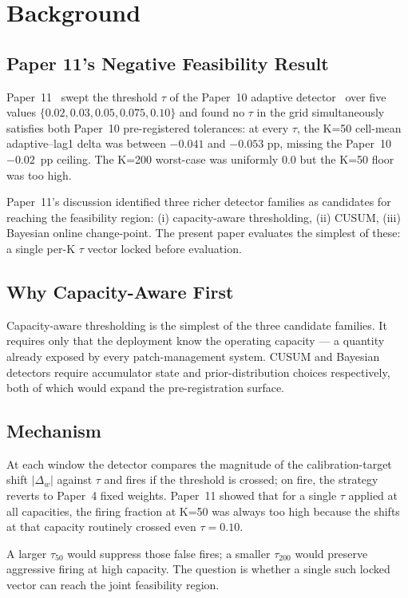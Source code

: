 \section{Background}

\subsection{Paper 11's Negative Feasibility Result}

Paper~11~\cite{paper11tau} swept the threshold $\tau$ of the Paper~10
adaptive detector~\cite{paper10adaptive} over five values
$\{0.02, 0.03, 0.05, 0.075, 0.10\}$ and found no $\tau$ in the grid
simultaneously satisfies both Paper~10 pre-registered tolerances: at
every $\tau$, the K=50 cell-mean adaptive--lag1 delta was between
$-0.041$ and $-0.053$ pp, missing the Paper~10 $-0.02$~pp ceiling.
The K=200 worst-case was uniformly $0.0$ but the K=50 floor was
too high.

Paper~11's discussion identified three richer detector families as
candidates for reaching the feasibility region: (i) capacity-aware
thresholding, (ii) CUSUM, (iii) Bayesian online change-point. The
present paper evaluates the simplest of these: a single per-K $\tau$
vector locked before evaluation.

\subsection{Why Capacity-Aware First}

Capacity-aware thresholding is the simplest of the three candidate
families. It requires only that the deployment know the operating
capacity --- a quantity already exposed by every patch-management
system. CUSUM and Bayesian detectors require accumulator state and
prior-distribution choices respectively, both of which would expand
the pre-registration surface.

\subsection{Mechanism}

At each window the detector compares the magnitude of the
calibration-target shift $|\Delta_w|$ against $\tau$ and fires if
the threshold is crossed; on fire, the strategy reverts to Paper~4
fixed weights. Paper~11 showed that for a single $\tau$ applied at
all capacities, the firing fraction at K=50 was always too high
because the shifts at that capacity routinely crossed even
$\tau = 0.10$.

A larger $\tau_{50}$ would suppress those false fires; a smaller
$\tau_{200}$ would preserve aggressive firing at high capacity. The
question is whether a single such locked vector can reach the joint
feasibility region.
